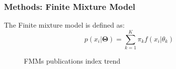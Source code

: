 \documentclass[xcolor=svgnames]{beamer}
\begin{document}
\begin{frame}\frametitle{Methods: Finite Mixture Model}

  The Finite mixture model is defined as:
\begin{equation}
p(x_i|\mathbf{\Theta}) = \sum_{k=1}^{K} \pi_k f(x_i|\theta_k)
\end{equation}

\begin{figure}
  \centering
  \caption{FMMs publications index trend~\cite{fmmtrend}}
\end{figure}

\end{frame}

\end{document}
